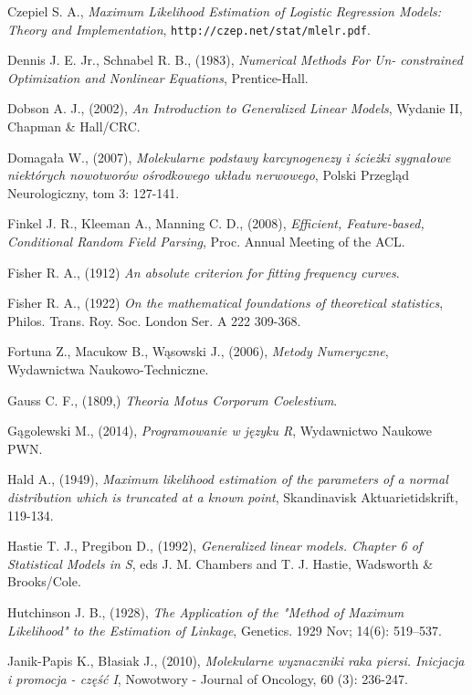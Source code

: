 \begin{thebibliography}{99}
 Czepiel S. A., \textit{Maximum Likelihood Estimation of Logistic Regression Models: Theory and Implementation}, \texttt{http://czep.net/stat/mlelr.pdf}.

 Dennis J. E. Jr., Schnabel R. B., (1983), \textit{Numerical Methods For Un-
constrained Optimization and Nonlinear Equations}, Prentice-Hall.

 Dobson A. J., (2002), \textit{An Introduction to Generalized Linear Models}, Wydanie II, Chapman \& Hall/CRC.

 Domagała W., (2007), \textit{Molekularne podstawy karcynogenezy i ścieżki sygnałowe niektórych nowotworów ośrodkowego układu nerwowego}, Polski Przegląd Neurologiczny, tom 3: 127-141.

  Finkel J. R., Kleeman A., Manning C. D., (2008), \textit{Efficient, Feature-based, Conditional Random Field Parsing}, Proc. Annual Meeting of the ACL.

 Fisher R. A., (1912) \textit{An absolute criterion for fitting frequency curves}.

 Fisher R. A., (1922) \textit{On the mathematical foundations of theoretical statistics}, Philos. Trans. Roy. Soc. London Ser. A 222 309-368.

 Fortuna Z., Macukow B., Wąsowski J., (2006), \textit{Metody Numeryczne}, Wydawnictwa Naukowo-Techniczne.

 Gauss C. F., (1809,) \textit{Theoria Motus Corporum Coelestium}.

 Gągolewski M., (2014), \textit{Programowanie w języku R}, Wydawnictwo Naukowe PWN.


 Hald A., (1949), \textit{Maximum likelihood estimation of the parameters of a normal distribution which is truncated at a known point}, Skandinavisk Aktuarietidskrift, 119-134.


 Hastie T. J., Pregibon D., (1992), \textit{Generalized linear models. Chapter 6 of Statistical Models in S}, eds J. M. Chambers and T. J. Hastie, Wadsworth \& Brooks/Cole.


 Hutchinson J. B., (1928), \textit{The Application of the "Method of Maximum Likelihood" to the Estimation of Linkage}, Genetics. 1929 Nov; 14(6): 519–537.


 Janik-Papis K., Błasiak J., (2010), \textit{Molekularne wyznaczniki raka piersi. Inicjacja i promocja - część I}, Nowotwory - Journal of Oncology, 60 (3): 236-247.


\end{thebibliography}
